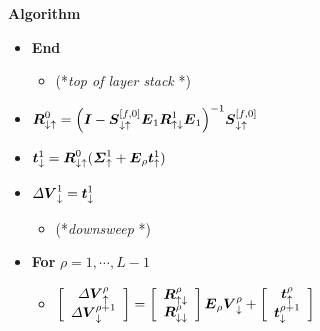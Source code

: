 \begin{figure}
{\begin{minipage} {140.0mm}{\bf  Algorithm}
\begin{itemize}
\begin{itemize}
\item  $\left[{\begin{array}{c}
{\bmi t}_{ \uparrow }^{\rho}\\ {\bmi t}_{ \downarrow }^{\rho+1}\end{array}}\right]=
\left[{\begin{array}{cc}
{\bmi R}_{ \uparrow \downarrow }^{\rho}&{\bmi R}_{ \uparrow \uparrow }^{\rho}\\ 
{\bmi R}_{ \downarrow \downarrow }^{\rho}&{\bmi R}_{ \downarrow \uparrow 
}^{\rho}\end{array}}\right]
\left[{\begin{array}{c}{\bmi \Sigma}^{\rho}_{\downarrow}\\ 
{\bmi \Sigma}^{\rho+1}_{\uparrow} + {\bmi  E}_{\rho+1}{  \bmi t}_{ \uparrow }^{\rho+1}
\end{array}}\right]$
\end{itemize}
\item {\bf  End}

\begin{itemize}
\item  (*{\em top of layer stack\/ }*) 
\end{itemize}
\item ${\mbox{\boldmath$\mit R$\unboldmath}}_{ \downarrow \uparrow }^{0} = 
{\left({{\mbox{\boldmath$\mit I$\unboldmath}}-{\mbox{\boldmath$\mit S$\unboldmath}}_{ \downarrow \uparrow }^{[f,{0}]}
{\mbox{\boldmath$\mit E$\unboldmath}}_{1} {\mbox{\boldmath$\mit R$\unboldmath}}_{ \uparrow \downarrow }^{1} {\mbox{\boldmath$\mit E$\unboldmath}}_{1} }\right)}^{-1}
{\mbox{\boldmath$\mit S$\unboldmath}}_{ \downarrow \uparrow }^{[f,{0}]}$


\item  ${\mbox{\boldmath$\mit t$\unboldmath}}_{ \downarrow }^{1}={\mbox{\boldmath$\mit R$\unboldmath}}_{ \downarrow \uparrow }^{0}
({\mbox{\boldmath$\mit \Sigma$\unboldmath}}^{1}_{\uparrow}+{\mbox{\boldmath$\mit E$\unboldmath}}_{\rho}{  \mbox{\boldmath$\mit t$\unboldmath}}_{ \uparrow }^{1})$

\item  ${\mit \Delta}{{\mbox{\boldmath$\mit V$\unboldmath}}}_{ \downarrow }^{1}={\mbox{\boldmath$\mit t$\unboldmath}}_{ \downarrow 
}^{1}$

\begin{itemize}
\item  (*{\em downsweep\/ }*) 
\end{itemize}
\item {\bf  For} $\rho=1,\cdots,L-1$
\begin{itemize}
\item  $
\left[{\begin{array}{c}
{\mit \Delta}{{\mbox{\boldmath$\mit V$\unboldmath}}}_{ \uparrow }^{\rho}\\ {\mit \Delta}{{\mbox{\boldmath$\mit V$\unboldmath}}}_{ 
\downarrow }^{\rho+1}\end{array}}\right]=\left[{\begin{array}{c}{  \mbox{\boldmath$\mit R$\unboldmath}}_{ 
\uparrow \downarrow }^{\rho}\\ {  \mbox{\boldmath$\mit R$\unboldmath}}_{ \downarrow \downarrow 
}^{\rho}\end{array}}\right] {\mbox{\boldmath$\mit E$\unboldmath}}_{\rho} {  {\mbox{\boldmath$\mit V$\unboldmath}}}_{ \downarrow 
}^{\rho}+\left[{\begin{array}{c}{  \mbox{\boldmath$\mit t$\unboldmath}}_{ \uparrow }^{\rho}\\ {  
\mbox{\boldmath$\mit t$\unboldmath}}_{ \downarrow }^{\rho+1}\end{array}}\right] $


\end{itemize}
\end{itemize}
\end{minipage}}
\end{figure}
